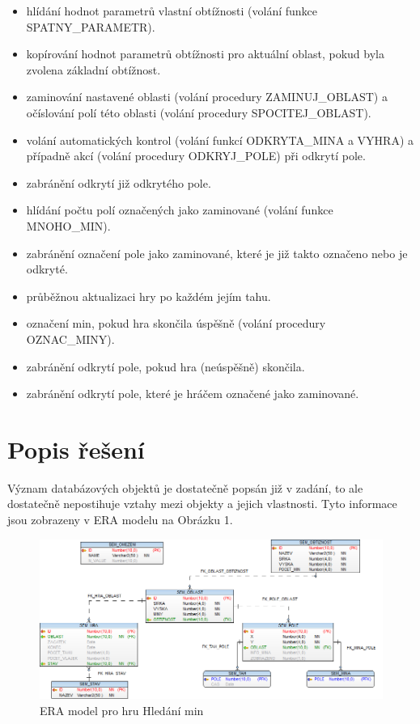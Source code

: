 \documentclass[12pt, a4paper]{article}
\begin{document}
\begin{itemize}
\item hlídání hodnot parametrů vlastní obtížnosti (volání funkce SPATNY\_PARAMETR).
\item kopírování hodnot parametrů obtížnosti pro aktuální oblast, pokud byla zvolena základní obtížnost.
\item zaminování nastavené oblasti (volání procedury ZAMINUJ\_OBLAST) a očíslování polí této oblasti (volání procedury SPOCITEJ\_OBLAST).
\item volání automatických kontrol (volání funkcí ODKRYTA\_MINA a VYHRA) a případně akcí (volání procedury ODKRYJ\_POLE) při odkrytí pole.
\item zabránění odkrytí již odkrytého pole.
\item hlídání počtu polí označených jako zaminované (volání funkce MNOHO\_MIN).
\item zabránění označení pole jako zaminované, které je již takto označeno nebo je odkryté.
\item průběžnou aktualizaci hry po každém jejím tahu.
\item označení min, pokud hra skončila úspěšně (volání procedury OZNAC\_MINY).
\item zabránění odkrytí pole, pokud hra (neúspěšně) skončila.
\item zabránění odkrytí pole, které je hráčem označené jako zaminované.
\end{itemize}


\newpage

\section{Popis řešení}

Význam databázových objektů je dostatečně popsán již v zadání, to ale dostatečně nepostihuje vztahy mezi objekty a jejich vlastnosti. Tyto informace jsou zobrazeny v ERA modelu na Obrázku 1. 


\begin{figure}[h!]
\centering
\label{fig:era}
\includegraphics[bb= 0 0 908 423 , width=150mm]{ERA.png}
\caption{ERA model pro hru Hledání min}
\end{figure}
\end{document}
